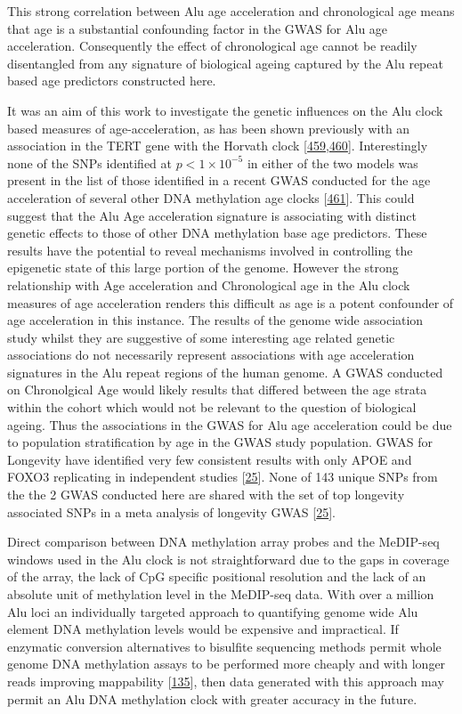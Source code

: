 \documentclass[
]{book}
\begin{document}
This strong correlation between Alu age acceleration and chronological age means that age is a substantial confounding factor in the GWAS for Alu age acceleration.
Consequently the effect of chronological age cannot be readily disentangled from any signature of biological ageing captured by the Alu repeat based age predictors constructed here.

It was an aim of this work to investigate the genetic influences on the Alu clock based measures of age-acceleration, as has been shown previously with an association in the TERT gene with the Horvath clock {[}\protect\hyperlink{ref-Lu2017}{459},\protect\hyperlink{ref-Gibson2019}{460}{]}.
Interestingly none of the SNPs identified at \(p < 1\times10^{-5}\) in either of the two models was present in the list of those identified in a recent GWAS conducted for the age acceleration of several other DNA methylation age clocks {[}\protect\hyperlink{ref-Mccartney2020}{461}{]}.
This could suggest that the Alu Age acceleration signature is associating with distinct genetic effects to those of other DNA methylation base age predictors.
These results have the potential to reveal mechanisms involved in controlling the epigenetic state of this large portion of the genome.
However the strong relationship with Age acceleration and Chronological age in the Alu clock measures of age acceleration renders this difficult as age is a potent confounder of age acceleration in this instance.
The results of the genome wide association study whilst they are suggestive of some interesting age related genetic associations do not necessarily represent associations with age acceleration signatures in the Alu repeat regions of the human genome.
A GWAS conducted on Chronolgical Age would likely results that differed between the age strata within the cohort which would not be relevant to the question of biological ageing.
Thus the associations in the GWAS for Alu age acceleration could be due to population stratification by age in the GWAS study population.
GWAS for Longevity have identified very few consistent results with only APOE and FOXO3 replicating in independent studies {[}\protect\hyperlink{ref-Broer2015}{25}{]}.
None of 143 unique SNPs from the the 2 GWAS conducted here are shared with the set of top longevity associated SNPs in a meta analysis of longevity GWAS {[}\protect\hyperlink{ref-Broer2015}{25}{]}.

Direct comparison between DNA methylation array probes and the MeDIP-seq windows used in the Alu clock is not straightforward due to the gaps in coverage of the array, the lack of CpG specific positional resolution and the lack of an absolute unit of methylation level in the MeDIP-seq data.
With over a million Alu loci an individually targeted approach to quantifying genome wide Alu element DNA methylation levels would be expensive and impractical.
If enzymatic conversion alternatives to bisulfite sequencing methods permit whole genome DNA methylation assays to be performed more cheaply and with longer reads improving mappability {[}\protect\hyperlink{ref-Williams2019}{135}{]}, then data generated with this approach may permit an Alu DNA methylation clock with greater accuracy in the future.
\end{document}

